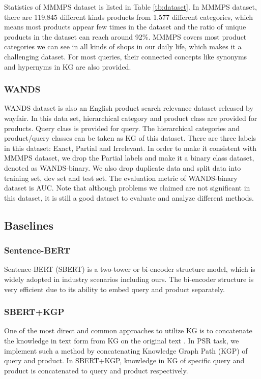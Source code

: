 Statistics of MMMPS dataset is listed in Table \ref{tb:dataset}. In MMMPS dataset, there are 119,845 different kinds products from 1,577 different categories, which means most products appear few times in the dataset and the ratio of unique products in the dataset can reach around 92\%. MMMPS covers most product categories we can see in all kinds of shops in our daily life, which makes it a challenging dataset. For most queries, their connected concepts like synonyms and hypernyms in KG are also provided.

\subsubsection{WANDS}

WANDS dataset \cite{chen2022wands} is also an English product search relevance dataset released by wayfair. In this data set, hierarchical category and product class are provided for products. Query class is provided for query. The hierarchical categories and product/query classes can be taken as KG of this dataset. There are three labels in this dataset: Exact, Partial and Irrelevant. In order to make it consistent with MMMPS dataset, we drop the Partial labels and make it a binary class dataset, denoted as WANDS-binary. We also drop duplicate data and split data into training set, dev set and test set. The evaluation metric of WANDS-binary dataset is AUC. Note that although problems we claimed are not significant in this dataset, it is still a good dataset to evaluate and analyze different methods. 

\subsection{Baselines}
\subsubsection{Sentence-BERT}
Sentence-BERT (SBERT) \cite{reimers2019sentence} is a two-tower or bi-encoder structure model, which is widely adopted in industry scenarios including ours. The bi-encoder structure is very efficient due to its ability to embed query and product separately.

\subsubsection{SBERT+KGP}
One of the most direct and common approaches to utilize KG is to concatenate the knowledge in text form from KG on the original text \cite{bian2021benchmarking, weijie2019kbert}. In PSR task, we implement such a method by concatenating Knowledge Graph Path (KGP) of query and product. In SBERT+KGP, knowledge in KG of specific query and product is concatenated to query and product respectively.


